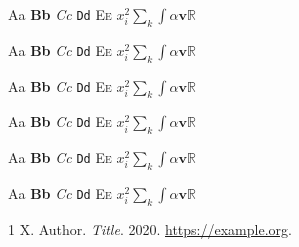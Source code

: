 \documentclass[11pt]{article}
\begin{document}
{\normalsize Aa \textbf{Bb} \emph{Cc} \texttt{Dd} \textsc{Ee} $x_{i}^{2} \sum_k \int \alpha \mathbf{v} \mathbb{R}$}\par
{\large Aa \textbf{Bb} \emph{Cc} \texttt{Dd} \textsc{Ee} $x_{i}^{2} \sum_k \int \alpha \mathbf{v} \mathbb{R}$}\par
{\Large Aa \textbf{Bb} \emph{Cc} \texttt{Dd} \textsc{Ee} $x_{i}^{2} \sum_k \int \alpha \mathbf{v} \mathbb{R}$}\par
{\LARGE Aa \textbf{Bb} \emph{Cc} \texttt{Dd} \textsc{Ee} $x_{i}^{2} \sum_k \int \alpha \mathbf{v} \mathbb{R}$}\par
{\huge Aa \textbf{Bb} \emph{Cc} \texttt{Dd} \textsc{Ee} $x_{i}^{2} \sum_k \int \alpha \mathbf{v} \mathbb{R}$}\par
{\Huge Aa \textbf{Bb} \emph{Cc} \texttt{Dd} \textsc{Ee} $x_{i}^{2} \sum_k \int \alpha \mathbf{v} \mathbb{R}$}\par

\begin{thebibliography}{1} X. Author. \emph{Title}. 2020. \url{https://example.org}.\end{thebibliography}
\end{document}
